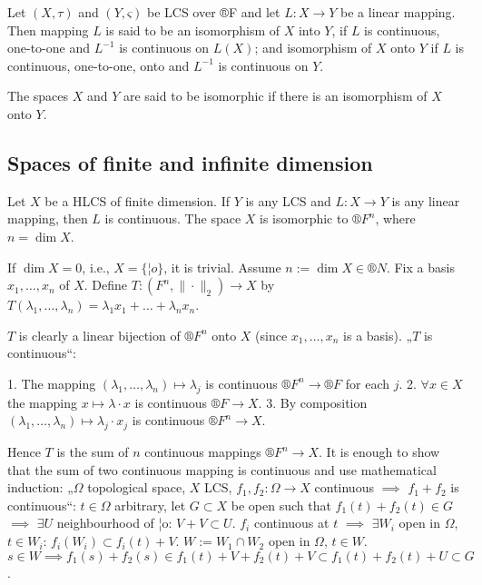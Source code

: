 \documentclass[12pt]{article}					%
\begin{document}
\begin{definice}
	Let $(X, τ)$ and $(Y, ς)$ be LCS over ®F and let $L: X \rightarrow Y$ be a linear mapping. Then mapping $L$ is said to be an isomorphism of $X$ into $Y$, if $L$ is continuous, one-to-one and $L^{-1}$ is continuous on $L(X)$; and isomorphism of $X$ onto $Y$ if $L$ is continuous, one-to-one, onto and $L^{-1}$ is continuous on $Y$.

	The spaces $X$ and $Y$ are said to be isomorphic if there is an isomorphism of $X$ onto $Y$.
\end{definice}

\subsection{Spaces of finite and infinite dimension}
\begin{tvrzeni}
	Let $X$ be a HLCS of finite dimension. If $Y$ is any LCS and $L : X \rightarrow Y$ is any linear mapping, then $L$ is continuous. The space $X$ is isomorphic to $®F^n$, where $n = \dim X$.

	\begin{dukazin}
		If $\dim X = 0$, i.e., $X = \{¦o\}$, it is trivial. Assume $n := \dim X \in ®N$. Fix a basis $x_1, …, x_n$ of $X$. Define $T: (F^n, \|·\|_2) \rightarrow X$ by $T(λ_1, …, λ_n) = λ_1x_1 + … + λ_nx_n$.

		$T$ is clearly a linear bijection of $®F^n$ onto $X$ (since $x_1, …, x_n$ is a basis). „$T$ is continuous“:

		1. The mapping $(λ_1, …, λ_n) \mapsto λ_j$ is continuous $®F^n \rightarrow ®F$ for each $j$. 2. $\forall x \in X$ the mapping $x \mapsto λ·x$ is continuous $®F \rightarrow X$. 3. By composition $(λ_1, …, λ_n) \mapsto λ_j·x_j$ is continuous $®F^n \rightarrow X$.

		Hence $T$ is the sum of $n$ continuous mappings $®F^n \rightarrow X$. It is enough to show that the sum of two continuous mapping is continuous and use mathematical induction: „$Ω$ topological space, $X$ LCS, $f_1, f_2: Ω \rightarrow X$ continuous $\implies$ $f_1 + f_2$ is continuous“: $t \in Ω$ arbitrary, let $G \subset X$ be open such that $f_1(t) + f_2(t) \in G$ $\implies$ $\exists U$ neighbourhood of ¦o: $V + V \subset U$. $f_i$ continuous at $t$ $\implies$ $\exists W_i$ open in $Ω$, $t \in W_i$: $f_i(W_i) \subset f_i(t) + V$. $W := W_1 \cap W_2$ open in $Ω$, $t \in W$. $s \in W \implies f_1(s) + f_2(s) \in f_1(t) + V + f_2(t) + V \subset f_1(t) + f_2(t) + U \subset G$.


\end{dukazin}
\end{tvrzeni}
\end{document}
